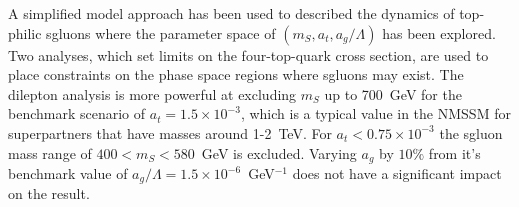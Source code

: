 A simplified model approach has been used to described the dynamics of top-philic sgluons where the parameter space of $(m_{S}, a_{t}, a_{g}/\Lambda)$ has been explored. Two analyses, which set limits on the four-top-quark cross section, are used to place constraints on the phase space regions where sgluons may exist. The dilepton analysis is more powerful at excluding $m_{S}$ up to 700~GeV for the benchmark scenario of $a_{t}=1.5\times10^{-3}$, which is a typical value in the NMSSM for superpartners that have masses around 1-2~TeV. For $a_{t}<0.75\times10^{-3}$ the sgluon mass range of $400<m_{S}<580$~GeV is excluded. Varying $a_{g}$ by $10\%$ from it's benchmark value of $a_{g}/\Lambda = 1.5 \times 10^{-6}$~GeV$^{-1}$ does not have a significant impact on the result.